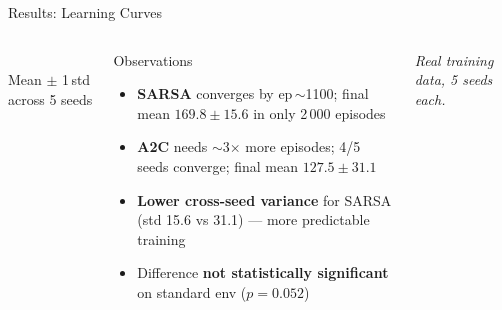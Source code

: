 \documentclass[aspectratio=169, 10pt]{beamer}
\begin{document}
\begin{frame}{Results: Learning Curves}
\begin{columns}[T]
\begin{center}
\\
        \small\color{silver}Mean $\pm$ 1\,std across 5 seeds
      \end{center}
      \begin{block}{Observations}
        \begin{itemize}
          \item \textbf{SARSA} converges by ep\,$\sim$1100; final
                mean $169.8 \pm 15.6$ in only 2\,000 episodes
          \item \textbf{A2C} needs $\sim$3$\times$ more episodes;
                4/5 seeds converge; final mean $127.5 \pm 31.1$
          \item \textbf{Lower cross-seed variance} for SARSA
                (std 15.6 vs 31.1) --- more predictable training
          \item Difference \textbf{not statistically significant}
                on standard env ($p = 0.052$)
        \end{itemize}
      \end{block}
      \vspace{0.3em}
      \small\color{silver!80}
      \emph{Real training data, 5 seeds each.}
  \end{columns}
\end{frame}
\end{document}
